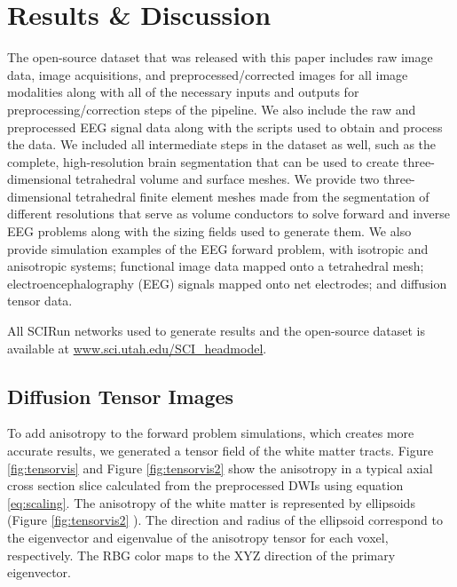 %

\section{Results \& Discussion}
\label{sec:results}

The open-source dataset that was released with this paper includes raw image data, image acquisitions, and preprocessed/corrected images for all image modalities along with all of the necessary inputs and outputs for preprocessing/correction steps of the pipeline. We also include the raw and preprocessed EEG signal data along with the scripts used to obtain and process the data. We included all intermediate steps in the dataset as well, such as the complete, high-resolution brain segmentation that can be used to create three-dimensional tetrahedral volume and surface meshes. We provide two three-dimensional tetrahedral finite element meshes made from the segmentation of different resolutions that serve as volume conductors to solve forward and inverse EEG problems along with the sizing fields used to generate them. We also provide simulation examples of the EEG forward problem, with isotropic and anisotropic systems; functional image data mapped onto a tetrahedral mesh; electroencephalography (EEG) signals mapped onto net electrodes; and diffusion tensor data. 

All SCIRun networks used to generate results and the open-source dataset is available at \url{www.sci.utah.edu/SCI_headmodel}. 

\subsection{Diffusion Tensor Images}

To add anisotropy to the forward problem simulations, which creates more accurate results, we generated a tensor field of the white matter tracts. Figure \ref{fig:tensorvis} and Figure \ref{fig:tensorvis2} show the anisotropy in a typical axial cross section slice calculated from the preprocessed DWIs using equation \ref{eq:scaling}. The anisotropy of the white matter is represented by ellipsoids (Figure \ref{fig:tensorvis2} ). The direction and radius of the ellipsoid correspond to the eigenvector and eigenvalue of the anisotropy tensor for each voxel, respectively. The RBG color maps to the XYZ direction of the primary eigenvector.               


